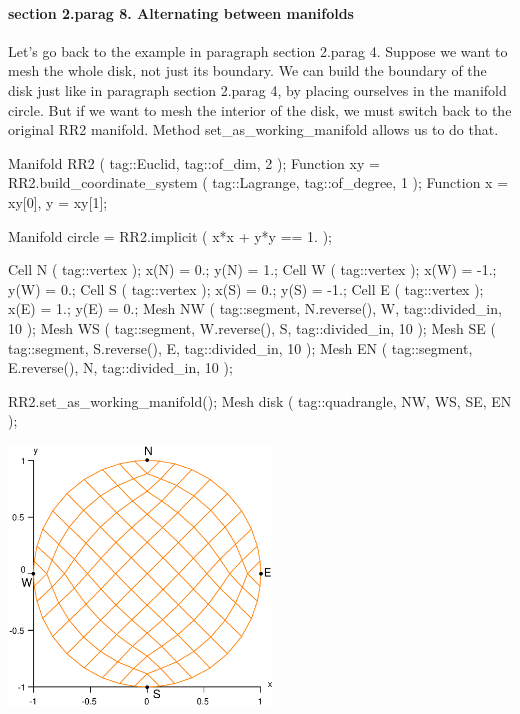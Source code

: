 \paragraph{\numb section 2.\numb parag 8. Alternating between manifolds}

Let's go back to the example in paragraph \numb section 2.\numb parag 4.
Suppose we want to mesh the whole disk, not just its boundary.
We can build the boundary of the disk just like in paragraph \numb section 2.\numb parag 4,
by placing ourselves in the manifold {\codett circle}.
But if we want to mesh the interior of the disk, we must switch back to the original
{\codett RR2} manifold.
Method {\codett set\_as\_working\_manifold} allows us to do that.

\verbatim
   Manifold RR2 ( tag::Euclid, tag::of_dim, 2 );
   Function xy = RR2.build_coordinate_system ( tag::Lagrange, tag::of_degree, 1 );
   Function x = xy[0],  y = xy[1];
   
   Manifold circle = RR2.implicit ( x*x + y*y == 1. );
   
   Cell N ( tag::vertex );  x(N) =  0.;   y(N) =  1.;
   Cell W ( tag::vertex );  x(W) = -1.;   y(W) =  0.;
   Cell S ( tag::vertex );  x(S) =  0.;   y(S) = -1.;
   Cell E ( tag::vertex );  x(E) =  1.;   y(E) =  0.;
   Mesh NW ( tag::segment, N.reverse(), W, tag::divided_in, 10 );
   Mesh WS ( tag::segment, W.reverse(), S, tag::divided_in, 10 );
   Mesh SE ( tag::segment, S.reverse(), E, tag::divided_in, 10 );
   Mesh EN ( tag::segment, E.reverse(), N, tag::divided_in, 10 );
   
   RR2.set_as_working_manifold();
   Mesh disk ( tag::quadrangle, NW, WS, SE, EN );
\endverbatim

{ 
\centerline{\includegraphics[width=70mm]{disk.eps}} }

